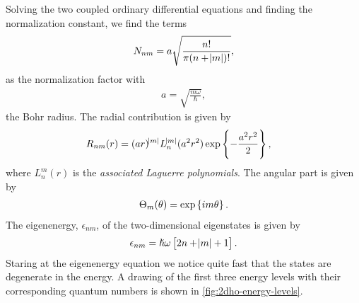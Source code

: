         Solving the two coupled ordinary differential equations and finding the
        normalization constant, we find the terms
        \begin{align}
            N_{nm} = a\sqrt{\frac{n!}{\pi(n + \abs{m})!}},
        \end{align}
        as the normalization factor with
        \begin{align}
            a = \sqrt{\frac{m\omega}{\hslash}},
        \end{align}
        the Bohr radius. The radial contribution is given by
        \begin{align}
            R_{nm}(r)
            &= (ar)^{\abs{m}}L^{\abs{m}}_{n}(a^2r^2)
            \exp\left\{ -\frac{a^2 r^2}{2} \right\},
        \end{align}
        where $L^{m}_{n}(r)$ is the \emph{associated Laguerre polynomials}. The
        angular part is given by
        \begin{align}
            \Theta_m(\theta) = \exp\left\{ im\theta \right\}.
        \end{align}
        The eigenenergy, $\epsilon_{nm}$, of the two-dimensional eigenstates is
        given by
        \begin{align}
            \epsilon_{nm} = \hslash\omega\left[ 
                2n + \abs{m} + 1
             \right].
            \label{eq:eigenenergies_2dqd}
        \end{align}
        Staring at the eigenenergy equation we notice quite fast that the states
        are degenerate in the energy. A drawing of the first three energy levels
        with their corresponding quantum numbers is shown in
        \autoref{fig:2dho-energy-levels}.
